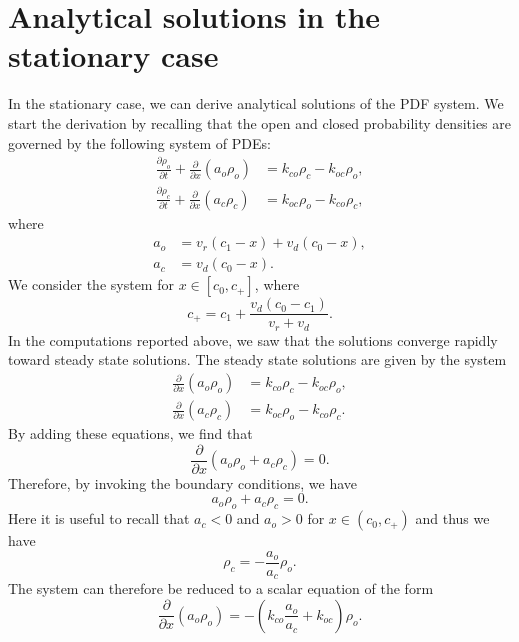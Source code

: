 \section{Analytical solutions in the stationary case \label{sec:analytical}}
In the stationary case, we can derive analytical solutions of the PDF system.
We start the derivation by recalling that the open and closed probability densities are governed by the
following system of PDEs:
\begin{align}
\frac{\partial\rho_{o}}{\partial t}+\frac{\partial}{\partial x}\left(
a_{o}\rho_{o}\right)   &  = k_{co}\rho_{c}-k_{oc}\rho_{o},\\
\frac{\partial\rho_{c}}{\partial t}+\frac{\partial}{\partial x}\left(
a_{c}\rho_{c}\right)   &  =k_{oc}\rho_{o}- k_{co}\rho_{c},
\end{align}
where 
\begin{align}
a_{o} &  =v_{r}(c_{1}-x)+v_{d}(c_{0}-x),\label{fluxes22}\\
a_{c} &  =v_{d}(c_{0}-x).\nonumber
\end{align}
We consider the system for $x\in\left[  c_{0},c_{+}\right]$, where%
\[
c_{+}=c_{1}+\frac{v_{d}\left(  c_{0}-c_{1}\right)  }{v_{r}+v_{d}}.
\]
In the computations reported above, we saw that the solutions converge rapidly
 toward steady state solutions. The steady state solutions are given
by the system
\begin{align}
\frac{\partial}{\partial x}\left(  a_{o}\rho_{o}\right)   &  = k_{co}%
\rho_{c}-k_{oc}\rho_{o}, \label{steadystate1}\\
\frac{\partial}{\partial x}\left(  a_{c}\rho_{c}\right)   &  =k_{oc}\rho
_{o}- k_{co}\rho_{c}. \label{steadystate2}
\end{align}
By adding these equations, we find that
\begin{equation}
\frac{\partial}{\partial x}\left(  a_{o}\rho_{o}+a_{c}\rho_{c}\right)  =0.
\end{equation}
Therefore, by invoking the boundary conditions, we have%
\begin{equation}
a_{o}\rho_{o}+a_{c}\rho_{c}=0.
\end{equation}
Here it is useful to recall that $a_{c}<0$ and $a_{o}>0$ for $x\in\left(
c_{0},c_{+}\right)  $ and thus we have%
\begin{equation}
\rho_{c}=-\frac{a_{o}}{a_{c}}\rho_{o}.
\end{equation}
The system can therefore be reduced to a scalar equation of the form%
\begin{equation}
\frac{\partial}{\partial x}\left(  a_{o}\rho_{o}\right)  =-\left(  
k_{co}\frac{a_{o}}{a_{c}}+k_{oc}\right)  \rho_{o}. \label{reduced}
\end{equation}
